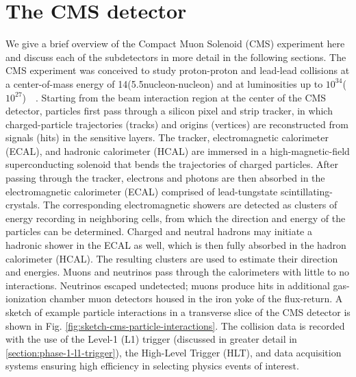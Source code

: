 \section{The CMS detector}
\label{section:cms-detector}
We give a brief overview of the Compact Muon Solenoid (CMS) experiment here and discuss each of the subdetectors in more detail in the following sections. The CMS experiment was conceived to study proton-proton and lead-lead collisions at a center-of-mass energy of 14\TeV (5.5\TeV nucleon-nucleon) and at luminosities up to $10^{34}$\percms ($10^{27}$\percms)~\cite{CMS-2008-JINST-3-S08004}~\cite{CERN-EP-2017-110}. Starting from the beam interaction region at the center of the CMS detector, particles first pass through a silicon pixel and strip tracker, in which charged-particle trajectories (tracks) and origins (vertices) are reconstructed from signals (hits) in the sensitive layers. The tracker, electromagnetic calorimeter (ECAL), and hadronic calorimeter (HCAL) are immersed in a high-magnetic-field superconducting solenoid that bends the trajectories of charged particles. After passing through the tracker, electrons and photons are then absorbed in the electromagnetic calorimeter (ECAL) comprised of lead-tungstate scintillating-crystals. The corresponding electromagnetic showers are detected as clusters of energy recording in neighboring cells, from which the direction and energy of the particles can be determined. Charged and neutral hadrons may initiate a hadronic shower in the ECAL as well, which is then fully absorbed in the hadron calorimeter (HCAL). The resulting clusters are used to estimate their direction and energies. Muons and neutrinos pass through the calorimeters with little to no interactions. Neutrinos escaped undetected; muons produce hits in additional gas-ionization chamber muon detectors housed in the iron yoke of the flux-return. A sketch of example particle interactions in a transverse slice of the CMS detector is shown in Fig. \ref{fig:sketch-cms-particle-interactions}. The collision data is recorded with the use of the Level-1 (L1) trigger (discussed in greater detail in \ref{section:phase-1-l1-trigger}), the High-Level Trigger (HLT), and data acquisition systems ensuring high efficiency in selecting physics events of interest. 

